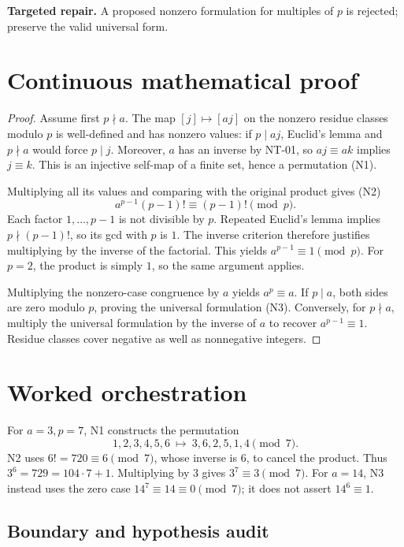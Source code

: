 \documentclass[preprint,12pt,aps,pra,showkeys,amsmath,amssymb,superscriptaddress,floatfix]{revtex4-2}
\theoremstyle{definition}
\theoremstyle{remark}
\newcommand{\field}[2]{\par\smallskip\noindent\textbf{#1.} #2\par}
\begin{document}
\field{Targeted repair}{A proposed nonzero formulation for multiples of \(p\) is rejected;
preserve the valid universal form.}

\clearpage\section{Continuous mathematical proof}\label{sec:proof}

\begin{proof}

Assume first \(p\nmid a\). The map \([j]\mapsto[aj]\) on the nonzero
residue classes modulo \(p\) is well-defined and has nonzero values: if
\(p\mid aj\), Euclid's lemma and \(p\nmid a\) would force \(p\mid j\).
Moreover, \(a\) has an inverse by NT-01, so \(aj\equiv ak\) implies
\(j\equiv k\). This is an injective self-map of a finite set, hence a
permutation (N1).

Multiplying all its values and comparing with the original product gives
(N2) \[a^{p-1}(p-1)!\equiv(p-1)!\pmod p.\] Each factor \(1,\ldots,p-1\)
is not divisible by \(p\). Repeated Euclid's lemma implies
\(p\nmid(p-1)!\), so its gcd with \(p\) is \(1\). The inverse criterion
therefore justifies multiplying by the inverse of the factorial. This
yields \(a^{p-1}\equiv1\pmod p\). For \(p=2\), the product is simply
\(1\), so the same argument applies.

Multiplying the nonzero-case congruence by \(a\) yields \(a^p\equiv a\).
If \(p\mid a\), both sides are zero modulo \(p\), proving the universal
formulation (N3). Conversely, for \(p\nmid a\), multiply the universal
formulation by the inverse of \(a\) to recover \(a^{p-1}\equiv1\).
Residue classes cover negative as well as nonnegative integers.

\end{proof}

\section{Worked orchestration}

For \(a=3,p=7\), N1 constructs the permutation
\[1,2,3,4,5,6\ \longmapsto\ 3,6,2,5,1,4\pmod7.\] N2 uses
\(6!=720\equiv6\pmod7\), whose inverse is \(6\), to cancel the product.
Thus \(3^6=729=104\cdot7+1\). Multiplying by \(3\) gives
\(3^7\equiv3\pmod7\). For \(a=14\), N3 instead uses the zero case
\(14^7\equiv14\equiv0\pmod7\); it does not assert \(14^6\equiv1\).

\subsection{Boundary and hypothesis audit}
\end{document}
